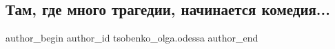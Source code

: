  
 
 
 
 
 
\subsection{Там, где много трагедии, начинается комедия...}
\label{sec:18_12_2022.fb.tsobenko_olga.odessa.1.tragedia_komedia}
 
\ifcmt
 author_begin
   author_id tsobenko_olga.odessa
 author_end
\fi
